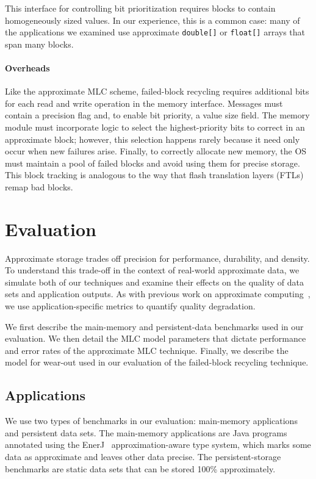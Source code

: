 This interface for controlling bit prioritization requires blocks to contain
homogeneously sized values. In our experience, this is a common case: many of
the applications we examined use approximate
\texttt{double[]} or \texttt{float[]} arrays that span many blocks.

\paragraph{Overheads}

Like the approximate MLC scheme, failed-block recycling requires additional
bits for each read and write operation in the memory interface.
Messages must contain a precision flag and, to enable bit priority, a value
size field.
The memory module must incorporate logic to select the highest-priority bits
to correct in an approximate block; however, this selection happens rarely
because it need only occur when new failures arise.
Finally, to correctly allocate new memory, the OS must maintain a pool of
failed blocks and avoid using them for precise storage.
This block tracking is analogous to the way that flash translation
layers (FTLs) remap bad blocks.


\section{Evaluation}
\label{approxstorage:sec:eval}

Approximate storage trades off precision for performance, durability, and density.
To understand this trade-off in the context of real-world approximate data, we
simulate both of our techniques and examine their effects on the quality of
data sets and application outputs. As with previous work on approximate
computing~\cite{enerj,npu,perforation}, we use
application-specific metrics to quantify quality
degradation.

We first describe the main-memory and persistent-data benchmarks used in our
evaluation. We then detail the MLC model parameters that dictate performance
and error rates of the approximate MLC technique. Finally, we describe the
model for wear-out used in our evaluation of the failed-block recycling
technique.

\subsection{Applications}

We use two types of benchmarks in our evaluation: main-memory applications and
persistent data sets. The main-memory applications are Java programs annotated
using the EnerJ~\cite{enerj} approximation-aware type system, which marks some
data as approximate and leaves other data precise. The persistent-storage
benchmarks are static data sets that can be stored 100\% approximately.

